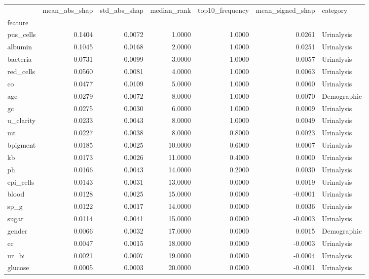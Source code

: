 \begin{tabular}{lrrrrrl}
\toprule
 & mean_abs_shap & std_abs_shap & median_rank & top10_frequency & mean_signed_shap & category \\
feature &  &  &  &  &  &  \\
\midrule
pus_cells & 0.1404 & 0.0072 & 1.0000 & 1.0000 & 0.0261 & Urinalysis \\
albumin & 0.1045 & 0.0168 & 2.0000 & 1.0000 & 0.0251 & Urinalysis \\
bacteria & 0.0731 & 0.0099 & 3.0000 & 1.0000 & 0.0057 & Urinalysis \\
red_cells & 0.0560 & 0.0081 & 4.0000 & 1.0000 & 0.0063 & Urinalysis \\
co & 0.0477 & 0.0109 & 5.0000 & 1.0000 & 0.0060 & Urinalysis \\
age & 0.0279 & 0.0072 & 8.0000 & 1.0000 & 0.0070 & Demographic \\
gc & 0.0275 & 0.0030 & 6.0000 & 1.0000 & 0.0009 & Urinalysis \\
u_clarity & 0.0233 & 0.0043 & 8.0000 & 1.0000 & 0.0049 & Urinalysis \\
mt & 0.0227 & 0.0038 & 8.0000 & 0.8000 & 0.0023 & Urinalysis \\
bpigment & 0.0185 & 0.0025 & 10.0000 & 0.6000 & 0.0007 & Urinalysis \\
kb & 0.0173 & 0.0026 & 11.0000 & 0.4000 & 0.0000 & Urinalysis \\
ph & 0.0166 & 0.0043 & 14.0000 & 0.2000 & 0.0030 & Urinalysis \\
epi_cells & 0.0143 & 0.0031 & 13.0000 & 0.0000 & 0.0019 & Urinalysis \\
blood & 0.0128 & 0.0025 & 15.0000 & 0.0000 & -0.0001 & Urinalysis \\
sp_g & 0.0122 & 0.0017 & 14.0000 & 0.0000 & 0.0036 & Urinalysis \\
sugar & 0.0114 & 0.0041 & 15.0000 & 0.0000 & -0.0003 & Urinalysis \\
gender & 0.0066 & 0.0032 & 17.0000 & 0.0000 & 0.0015 & Demographic \\
cc & 0.0047 & 0.0015 & 18.0000 & 0.0000 & -0.0003 & Urinalysis \\
ur_bi & 0.0021 & 0.0007 & 19.0000 & 0.0000 & -0.0004 & Urinalysis \\
glucose & 0.0005 & 0.0003 & 20.0000 & 0.0000 & -0.0001 & Urinalysis \\
\bottomrule
\end{tabular}

